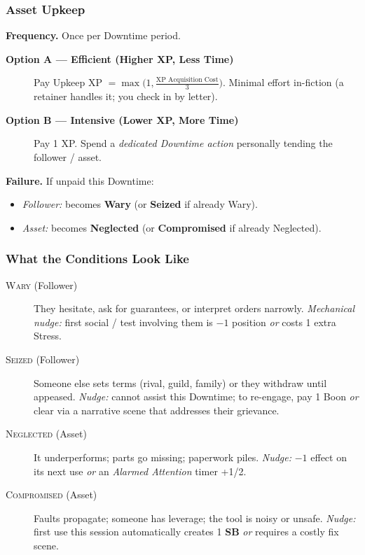 \subsubsection{Asset Upkeep}\label{subsec:upkeep_core}
\textbf{Frequency.} Once per Downtime period.

\begin{description}
    \item[\textbf{Option A --- Efficient (Higher XP, Less Time)}] Pay Upkeep XP \(= \max\bigl(1, \frac{\text{XP Acquisition Cost}}{3}\bigr)\). Minimal effort in-fiction (a retainer handles it; you check in by letter).
    \item[\textbf{Option B --- Intensive (Lower XP, More Time)}] Pay 1 XP. Spend a \emph{dedicated Downtime action} personally tending the follower / asset.
\end{description}

\textbf{Failure.} If unpaid this Downtime:
\begin{itemize}
    \item \emph{Follower:} becomes \textbf{Wary} (or \textbf{Seized} if already Wary).
    \item \emph{Asset:} becomes \textbf{Neglected} (or \textbf{Compromised} if already Neglected).
\end{itemize}

\subsubsection{What the Conditions Look Like}\label{subsec:upkeep_conditions}
\begin{description}
    \item[\textsc{Wary} (Follower)] They hesitate, ask for guarantees, or interpret orders narrowly. \emph{Mechanical nudge:} first social / test involving them is \(-1\) position \emph{or} costs 1 extra Stress.
    \item[\textsc{Seized} (Follower)] Someone else sets terms (rival, guild, family) or they withdraw until appeased. \emph{Nudge:} cannot assist this Downtime; to re-engage, pay 1 Boon \emph{or} clear via a narrative scene that addresses their grievance.
    \item[\textsc{Neglected} (Asset)] It underperforms; parts go missing; paperwork piles. \emph{Nudge:} \(-1\) effect on its next use \emph{or} an \emph{Alarmed Attention} timer +1/2.
    \item[\textsc{Compromised} (Asset)] Faults propagate; someone has leverage; the tool is noisy or unsafe. \emph{Nudge:} first use this session automatically creates 1 \textbf{SB} \emph{or} requires a costly fix scene.
\end{description}

